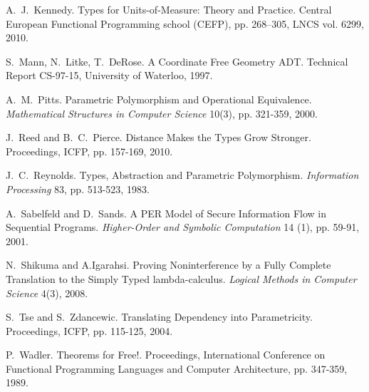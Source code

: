 \documentclass{sigplanconf}
\theoremstyle{examplestyle}
\theoremstyle{restatementstyle}
\begin{document}
\begin{thebibliography}{12}
A.~J.~Kennedy. Types for Units-of-Measure: Theory and Practice.
Central European Functional Programming school (CEFP), pp. 268--305, LNCS vol. 6299, 2010. 

S.~Mann, N.~Litke, T.~DeRose.  A Coordinate Free Geometry {ADT}.
Technical Report CS-97-15, University of Waterloo, 1997.

A.~M.~Pitts.  Parametric Polymorphism and Operational Equivalence.
{\em Mathematical Structures in Computer Science} 10(3), pp. 321-359,
2000.

J.~Reed and B.~C.~Pierce.  Distance Makes the Types Grow Stronger.
Proceedings, ICFP, pp. 157-169, 2010.

J.~C.~Reynolds. Types, Abstraction and Parametric Polymorphism.
{\em Information Processing} 83, pp. 513-523, 1983.

A.~Sabelfeld and D.~Sands.  A PER Model of Secure Information Flow in
Sequential Programs.  {\em Higher-Order and Symbolic Computation} 14
(1), pp. 59-91, 2001.

N.~Shikuma and A.Igarahsi.  Proving Noninterference by a Fully
Complete Translation to the Simply Typed lambda-calculus.  {\em
    Logical Methods in Computer Science} 4(3), 2008.

S.~Tse and S.~Zdancewic.  Translating Dependency into Parametricity.
Proceedings, ICFP,  pp.
115-125, 2004.

P.~Wadler.  Theorems for Free!.  Proceedings, International Conference
on Functional Programming Languages and Computer Architecture,
pp. 347-359, 1989.

\end{thebibliography}

%
%


% 
\end{document}
